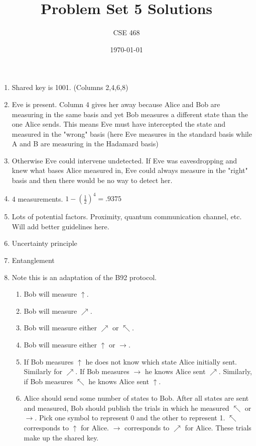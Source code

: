 \documentclass[12pt]{article}
\title{Problem Set 5 Solutions}
\author{CSE 468}
\date{\today}
\begin{document}
\maketitle

\begin{enumerate}[font=\bfseries]
    \item Shared key is 1001. (Columns 2,4,6,8)
    \item Eve is present. Column 4 gives her away because Alice and Bob are measuring in the same basis and yet Bob measures a different state than the one Alice sends. This means Eve must have intercepted the state and measured in the "wrong" basis (here Eve measures in the standard basis while A and B are measuring in the Hadamard basis)
    \item Otherwise Eve could intervene undetected. If Eve was eavesdropping and knew what bases Alice measured in, Eve could always measure in the "right" basis and then there would be no way to detect her.
    \item 4 measurements. $1 - (\frac{1}{2})^4 = .9375$
    \item Lots of potential factors. Proximity, quantum communication channel, etc. Will add better guidelines here.
    \item Uncertainty principle
    \item Entanglement
    \item Note this is an adaptation of the B92 protocol.
        \begin{enumerate}
            \item Bob will measure $\uparrow$.
            \item Bob will measure $\nearrow$. 
            \item Bob will measure either $\nearrow$ or $\nwarrow$.
            \item Bob will measure either $\uparrow$ or $\rightarrow$.
            \item If Bob measures $\uparrow$ he does not know which state Alice initially sent. Similarly for $\nearrow$. If Bob measures $\rightarrow$ he knows Alice sent $\nearrow$. Similarly, if Bob measures $\nwarrow$ he knows Alice sent $\uparrow$.
            \item Alice should send some number of states to Bob.  After all states are sent and measured, Bob should publish the trials in which he measured $\nwarrow$ or $\rightarrow$. Pick one symbol to represent 0 and the other to represent 1. $\nwarrow$ corresponds to $\uparrow$ for Alice. $\rightarrow$ corresponds to $\nearrow$ for Alice. These trials make up the shared key.

\end{enumerate}
\end{enumerate}
\end{document}
